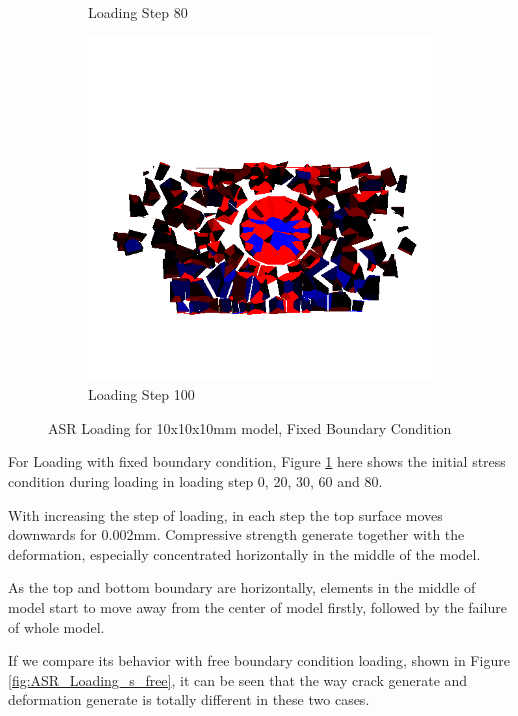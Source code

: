 \begin{figure}[ht!]
\begin{subfigure}{.33\textwidth}
      \caption{Loading Step 80}
      \end{subfigure}%
      \begin{subfigure}{.33\textwidth}
        \centering
        \includegraphics[width=1.0\linewidth]{Files/Small_ASR/IS2/DEP5-STEP(120).png}
        \caption{Loading Step 100}
      \end{subfigure}

  \caption{ASR Loading for 10x10x10mm model, Fixed Boundary Condition}
  \label{fig:ASR_Loading_s_fix}
\end{figure}

For Loading with fixed boundary condition, Figure \ref{fig:ASR_Loading_s_fix} here shows the initial stress condition during loading in loading step 0, 20, 30, 60 and 80.

With increasing the step of loading, in each step the top surface moves downwards for 0.002mm. Compressive strength generate together with the deformation, especially concentrated horizontally in the middle of the model.

As the top and bottom boundary are horizontally, elements in the middle of model start to move away from the center of model firstly, followed by the failure of whole model.

If we compare its behavior with free boundary condition loading, shown in Figure \ref{fig:ASR_Loading_s_free}, it can be seen that the way crack generate and deformation generate is totally different in these two cases.

